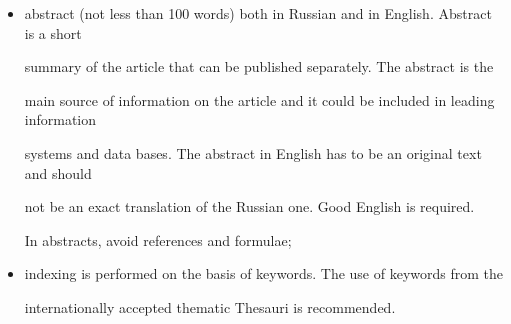 {\begin{enumerate}[1.]
\begin{itemize}
 \def\rightfootline{\small{INFORMATIKA I EE PRIMENENIYA~--- INFORMATICS AND APPLICATIONS\ \ \ 2024\ \ \ volume~18\ \ \ issue\ 3


\hfill \textbf{\thepage}}}




























\item abstract (not less than 100 words) both in Russian and in English. Abstract is a short


summary of the article that can be published separately. The abstract is the


main source of information on the article and it could be included in leading information


systems and data bases. The abstract in English has to be an original text and should


not be an exact translation of the Russian one. Good English is required.


In abstracts, avoid references and formulae;\\[-13.5pt]


\item indexing is performed on the basis of keywords. The use of keywords from the


internationally accepted thematic Thesauri is recommended.




















\end{itemize}
\end{enumerate}}
